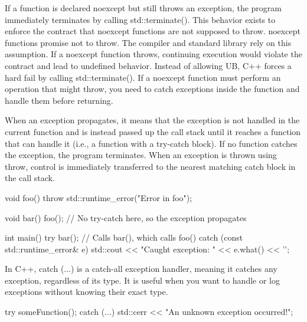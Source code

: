 \documentclass{report}
\begin{document}
    \pagebreak 
    \bigbreak \noindent 
    If a function is declared noexcept but still throws an exception, the program immediately terminates by calling std::terminate(). This behavior exists to enforce the contract that noexcept functions are not supposed to throw.
    \bigbreak \noindent 
    noexcept functions promise not to throw. The compiler and standard library rely on this assumption. If a noexcept function throws, continuing execution would violate the contract and lead to undefined behavior. Instead of allowing UB, C++ forces a hard fail by calling std::terminate().
    \bigbreak \noindent 
    If a noexcept function must perform an operation that might throw, you need to catch exceptions inside the function and handle them before returning.



    \pagebreak 
    \bigbreak \noindent 
    When an exception propagates, it means that the exception is not handled in the current function and is instead passed up the call stack until it reaches a function that can handle it (i.e., a function with a try-catch block). If no function catches the exception, the program terminates.
    \bigbreak \noindent 
    When an exception is thrown using throw, control is immediately transferred to the nearest matching catch block in the call stack.
    \bigbreak \noindent 
    \begin{cppcode}
    void foo() {
        throw std::runtime_error("Error in foo");
    }

    void bar() {
        foo();  // No try-catch here, so the exception propagates
    }

    int main() {
        try {
            bar();  // Calls bar(), which calls foo()
        } catch (const std::runtime_error& e) {
            std::cout << "Caught exception: " << e.what() << '\n';
        }
    }
\end{cppcode}

\pagebreak 
{}
\bigbreak \noindent 
In C++, catch (...) is a catch-all exception handler, meaning it catches any exception, regardless of its type. It is useful when you want to handle or log exceptions without knowing their exact type.
\bigbreak \noindent 
\begin{cppcode}
    try {
        someFunction();
    } catch (...) {
        std::cerr << "An unknown exception occurred!\n";
    }
\end{cppcode}
\end{document}
